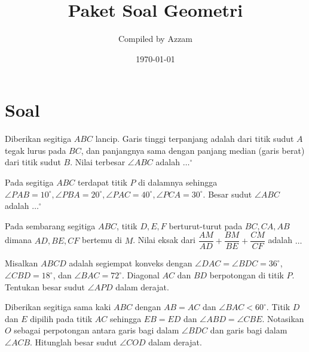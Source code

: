 \documentclass[12pt]{scrartcl}
\begin{document}
	\title{Paket Soal Geometri} %
	\date{\today}
	\author{Compiled by Azzam}
	\maketitle

\renewcommand*\contentsname{Daftar Isi}
\tableofcontents

\newpage
	\newpage
	
	\section{Soal}

	\begin{soalbaru}
		Diberikan segitiga $ABC$ lancip. Garis tinggi terpanjang adalah dari titik sudut $A$ tegak
			lurus pada $BC$, dan panjangnya sama dengan panjang median (garis berat) dari titik sudut $B$.
			Nilai terbesar $\angle ABC$ adalah $\dots^\circ$
	\end{soalbaru}
	
	\begin{soalbaru}
		Pada segitiga $ABC$ terdapat titik $P$ di dalamnya sehingga $\angle PAB = 10^\circ, \angle PBA = 20^\circ , \angle PAC = 40^\circ, \angle PCA = 30^\circ$. Besar sudut $\angle ABC$ adalah $\dots^\circ$ 
		
	\end{soalbaru}
	
	\begin{soalbaru}
			Pada sembarang segitiga $ABC$, titik $D,E,F$ berturut-turut pada $BC,CA,AB$ dimana $AD,BE,CF$ bertemu di $M$. Nilai eksak dari $\dfrac{AM}{AD}+\dfrac{BM}{BE}+\dfrac{CM}{CF}$ adalah $\dots$
		\end{soalbaru}
	
	\begin{soalbaru}
		Misalkan $ABCD$ adalah segiempat konveks dengan $\angle DAC=\angle BDC = 36^\circ$, $\angle CBD = 18^\circ$, dan $\angle BAC = 72^\circ$. Diagonal $AC$ dan $BD$ berpotongan di titik $P$. Tentukan besar sudut $\angle APD$ dalam derajat. %
	\end{soalbaru}
	
	\begin{soalbaru}
		Diberikan segitiga sama kaki $ABC$ dengan $AB = AC$ dan $\angle BAC < 60^\circ$. Titik $D$ dan $E$ dipilih pada titik $AC$ sehingga $EB = ED$ dan $\angle ABD = \angle CBE$. Notasikan $O$ sebagai perpotongan antara garis bagi dalam $\angle BDC$ dan garis bagi dalam $\angle ACB$. Hitunglah besar sudut $\angle COD$ dalam derajat. %
	\end{soalbaru}
	
\end{document}

